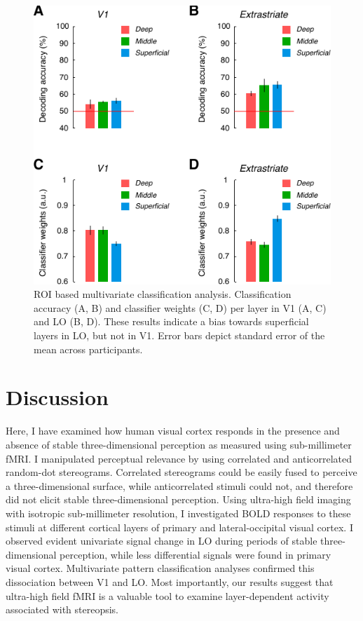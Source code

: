 \begin{figure}
  \centering
  \includegraphics[keepaspectratio]{Fig6}
  \caption[ROI based multivariate classification analysis.]{ROI based multivariate classification analysis. Classification accuracy (A, B) and classifier weights (C, D) per layer in V1 (A, C) and LO (B, D). These results indicate a bias towards superficial layers in LO, but not in V1. Error bars depict  standard error of the mean across participants.}
  \label{fig:ch5fig6}
\end{figure}


\section{Discussion}

Here, I have examined how human visual cortex responds in the presence and absence of stable three-dimensional perception as measured using sub-millimeter fMRI. I manipulated perceptual relevance by using correlated and anticorrelated random-dot stereograms. Correlated stereograms could be easily fused to perceive a three-dimensional surface, while anticorrelated stimuli could not, and therefore did not elicit stable three-dimensional perception. Using ultra-high field imaging with isotropic sub-millimeter resolution, I investigated BOLD responses to these stimuli at different cortical layers of primary and lateral-occipital visual cortex. I observed evident univariate signal change in LO during periods of stable three-dimensional perception, while less differential signals were found in primary visual cortex. Multivariate pattern classification analyses confirmed this dissociation between V1 and LO. Most importantly, our results suggest that ultra-high field fMRI is a valuable tool to examine layer-dependent activity associated with stereopsis.


